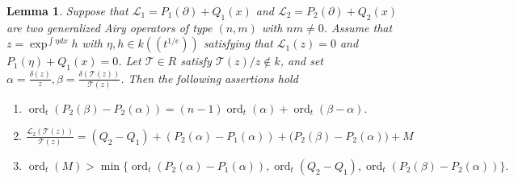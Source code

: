 \documentclass{article}
\newtheorem{lemma}[theorem]{Lemma}
\DeclareMathOperator{\ord}{ord}
\newcommand{\calL}{{\mathcal{L}}}
\newcommand{\calT}{{\mathcal{T}}}
\begin{document}
\begin{lemma}
  \label{LM:minimalorderinL2}
  Suppose that $\calL_1=P_1(\partial)+Q_1(x)$ and $\calL_2=P_2(\partial)+Q_2(x)$
  are two generalized Airy operators of type $(n,m)$ with $nm\neq 0$. Assume that 
  $z=\exp^{\int \eta dx} h$ with $\eta, h\in k((t^{1/e}))$ satisfying that
  $\calL_1(z)=0$ and $P_1(\eta)+Q_1(x)=0$. Let $\calT\in R$ satisfy $\calT(z)/z \notin k$, and set $\alpha=\frac{\delta(z)}{z}, \beta=\frac{\delta(\calT(z))}{\calT(z)}$. 
  Then the following assertions hold
  \begin{enumerate}
  \item [(1)] $\ord_t(P_2(\beta)-P_2(\alpha))=(n-1)\ord_t(\alpha)+\ord_t(\beta-\alpha).$
    \item [(2)]
    $\frac{\calL_2(\calT(z))}{\calT(z)}=(Q_2-Q_1)
 +(P_2(\alpha)-P_1(\alpha))
 +\bigl(P_2(\beta)-P_2(\alpha)\bigr)+M
  $
  \item [(3)]$\ord_t(M)>
     \min
     \{\ord_t(P_2(\alpha)-P_1(\alpha)), \ord_t(Q_2-Q_1),
     \ord_t(P_2(\beta)-P_2(\alpha))\}.
  $
  \end{enumerate}
\end{lemma}
\end{document}
